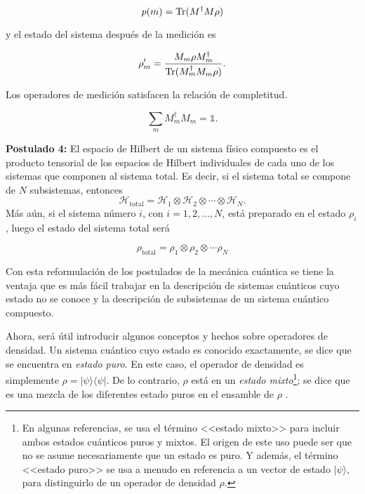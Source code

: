 \begin{equation}\label{probaility3postulate}
	p(m)={\rm Tr}(M^\dagger M \rho)
\end{equation}


y el estado del sistema después de la medición es 


\begin{equation}\label{state3postulate}
	\rho_m'=\dfrac{M_m\rho M_m^\dagger}{{\rm Tr}(M_m^\dagger M_m \rho)}.
\end{equation}


Los operadores de medición satisfacen la relación de completitud.

\begin{equation}\label{completitud3postulate}
	  	\sum_m M_m^\dagger M_m=\mathds{1}.
\end{equation}

\textbf{Postulado 4:} El espacio de Hilbert de un sistema físico compuesto es el producto tensorial de los espacios de Hilbert individuales de cada uno de los sistemas que componen al sistema total. Es decir, si el sistema total se compone de $N$ subsistemas, entonces
\begin{equation}\label{Htotal4postulado}
	\mathcal{H}_{\text{total}}=\mathcal{H}_1\otimes \mathcal{H}_2\otimes \cdots \otimes \mathcal{H}_N.
\end{equation}
  Más aún, si el sistema número $i$, con $i=1,2,\ldots,N$, está preparado en el estado $\rho_i$, luego el estado del sistema total será 

\begin{equation}\label{rhototal4postulado}
	\rho_{\text{total}}=\rho_1\otimes \rho_2 \otimes \cdots \rho_N
\end{equation}


\setlength{\leftskip}{0pt}

Con esta reformulación de los postulados de la mecánica cuántica se tiene la ventaja que es más fácil trabajar en la descripción de sistemas cuánticos cuyo estado no se conoce y la descripción de subsistemas de un sistema cuántico compuesto.


Ahora, será útil introducir algunos conceptos y hechos sobre operadores de densidad. Un sistema cuántico cuyo estado es conocido exactamente, se dice que se encuentra en \textit{estado puro}. En este caso, el operador de densidad es simplemente $\rho=|\psi \rangle \langle \psi|$. De lo contrario, $\rho$ está en un \textit{estado mixto}\footnote{En algunas referencias, se  usa el término <<estado mixto>> para incluir ambos estados cuánticos puros y mixtos. El origen de este uso puede ser que no se asume necesariamente que un estado es puro. Y además, el término <<estado puro>> se usa a menudo en referencia a un vector de estado $|\psi\rangle $, para distinguirlo de un operador de densidad	$\rho$. }; se dice que es una mezcla de los diferentes estado puros en el ensamble de $\rho$ {\cite{nielsen_chuang_2010}}. 

